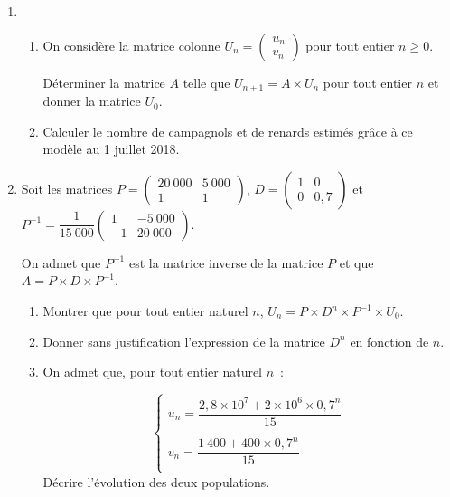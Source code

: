\begin{enumerate}
     \item
     \begin{enumerate}[label=\alph*.]
          \item On considère la matrice colonne $U_n = \begin{pmatrix}u_n\\v_n\end{pmatrix}$ pour tout entier $n \geqslant 0$.
          \par
          Déterminer la matrice $A$ telle que $U_{n+1} = A \times U_n$ pour tout entier $n$ et donner la matrice $U_0$.
          \item Calculer le nombre de campagnols et de renards estimés grâce à ce modèle au 1 juillet
          2018.
     \end{enumerate}
     \item Soit les matrices $P = \begin{pmatrix}20~000&5~000\\1&1\end{pmatrix}$, \:$D = \begin{pmatrix}1&0\\0&0,7\end{pmatrix}$ et $P^{- 1}  = \dfrac{1}{15~000}\begin{pmatrix}1& -5~000\\- 1&20~000\end{pmatrix}$.
     \par
     On admet que $P^{- 1}$ est la matrice inverse de la matrice $P$ et que $A = P \times D \times P^{- 1}$.
     \begin{enumerate}[label=\alph*.]
          \item Montrer que pour tout entier naturel $n$,\: $U_n = P \times D^n \times P^{- 1} \times U_0$.
          \item Donner sans justification l'expression de la matrice $D^n$ en fonction de $n$.
          \item On admet que, pour tout entier naturel $n$~:
          \par
          \[\left\{\begin{array}{l}
                    u_n = \dfrac{2,8 \times 10^7 + 2 \times 10^6 \times 0,7^n}{15}\\
                    \\
                    v_n =\dfrac{1~400 + 400 \times 0,7^n}{15}\\
          \end{array}\right.\]
          Décrire l'évolution des deux populations.
     \end{enumerate}
\end{enumerate}
